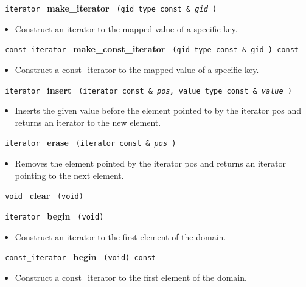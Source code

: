 \noindent
\texttt{%
iterator
}
\textbf{make\_iterator}%
\texttt{%
(gid\_type const \&
\textit{gid}%
)
}

\begin{itemize}
\item
Construct an iterator to the mapped value of a specific key.
\end{itemize}
 
\noindent
\texttt{%
const\_iterator 
}
\textbf{make\_const\_iterator}%
\texttt{%
(gid\_type const \&
gid
) const
}

\begin{itemize}
\item
Construct a const\_iterator to the mapped value of a specific key.
\end{itemize}

 
\noindent
\texttt{%
iterator 	
}
\textbf{insert}%
\texttt{
(iterator const \&
\textit{pos,}%
value\_type const \&
\textit{value}%
)
}

\begin{itemize}
\item
Inserts the given value before the element pointed to by the iterator pos and returns an iterator to the new element.
\end{itemize}
 
\noindent
\texttt{%
iterator 	
}
\textbf{erase}%
\texttt{
(iterator const \&
\textit{pos}%
)
}
 	
\begin{itemize}
\item
Removes the element pointed by the iterator pos and returns an iterator pointing to the next element.
\end{itemize}
 
\noindent
\texttt{%
void 
}
\textbf{clear}%
\texttt{
(void)
}

 
\noindent
\texttt{%
iterator
}
\textbf{begin}%
\texttt{%
(void)
}

\begin{itemize}
\item
Construct an iterator to the first element of the domain.
\end{itemize}
 
\noindent
\texttt{%
const\_iterator
}
\textbf{begin}%
\texttt{%
(void) const
}

\begin{itemize}
\item
Construct a const\_iterator to the first element of the domain.
\end{itemize}
 
